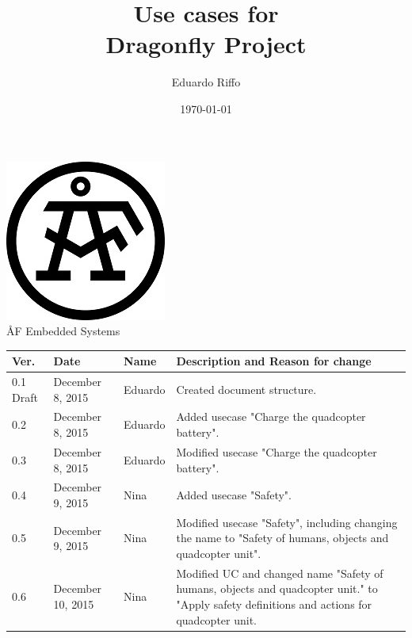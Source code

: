 \documentclass[a4paper]{article}
\title{ Use cases for\\ Dragonfly Project}
\author{Eduardo Riffo}
\date{\today}         		%
\begin{document}

\maketitle                      	%

\begin{center}
\vspace{64pt}
\includegraphics[scale=1.6]{images/AF_Logotype20141_Black.png}
\vspace{16pt}
\\ \large ÅF Embedded Systems
\end{center}

\vspace{16pt}
\begin{tabular}{ l l l p{8.5cm} }
	Ver. & Date & Name & Description and Reason for change \\\hline
	0.1 Draft & December 8, 2015 & Eduardo & Created document structure.\\
	0.2  & December 8, 2015 & Eduardo & Added usecase "Charge the quadcopter battery".\\
	0.3  & December 8, 2015 & Eduardo & Modified usecase "Charge the quadcopter battery".\\
	0.4	& December 9, 2015	& Nina	& Added usecase "Safety".\\
	0.5	& December 9, 2015	& Nina	& Modified usecase "Safety", including changing the name to "Safety of humans, objects and quadcopter unit".\\ 
	0.6	& December 10, 2015	& Nina	& Modified UC and changed name "Safety of humans, objects and quadcopter unit." to "Apply safety definitions and actions for quadcopter unit.\\
\end{tabular}

\newpage

\tableofcontents					%
\end{document}

